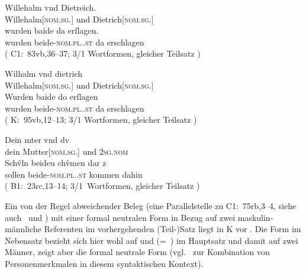 \begin{exe}
\ex \label{ex:dietwill2} %
	\begin{xlist}
	\ex \label{ex:dietwill2_2}
		\gll Willehalm vnd Dietreich. \\
			Willehalm[\textsc{nom.sg.\MascM}] und
				Dietrich[\textsc{nom.sg.\MascM}] \\
	\sn \gll wurden baíde da erſlagen. \\
			wurden beide-\textsc{nom.pl.\MascM.st} da erschlagen \\
		\trans {}
			(%
				C1:~83vb,36--37;
				3/1 Wortformen, gleicher Teilsatz%
			)

	\ex \label{ex:dietwill2_3}
		\gll Wilhalm vnd dietrich \\
			Willehalm[\textsc{nom.sg.\MascM}] und
				Dietrich[\textsc{nom.sg.\MascM}] \\
	\sn \gll Wurden baide do erſlagen \\
			wurden beide-\textsc{nom.pl.\MascM.st} da erschlagen \\
		\trans {}
			(%
				K:~95vb,12--13;
				3/1 Wortformen, gleicher Teilsatz%
			)
	\end{xlist}

\ex \label{ex:mutterdu2}
	\gll Dein mter vnd dv \\
		dein Mutter[\textsc{nom.sg.\FemF}] und \textsc{2sg\subM.nom} \\
\sn \gll Schv̂ln beideu chv̂men {dar z} \\
		sollen beide-\textsc{nom.pl.\NeutMF.st} kommen dahin \\
	\trans {}
		(%
			B1:~23rc,13--14;
			3/1~Wortformen, gleicher Teilsatz%
		)
\end{exe}

\label{phsec:baideuwarn3}
Ein von der Regel abweichender Beleg
(eine Parallelstelle zu C1:~75rb,3--4, siehe
auch~ und
) mit einer formal neutralen Form in Bezug auf zwei
maskulin-männ\-liche Referenten im vorhergehenden (Teil-)Satz liegt in K vor
. Die Form   im Nebensatz bezieht
sich hier wohl auf   und  
(=~) im Hauptsatz und damit auf zwei Männer, zeigt aber die formal
neutrale Form (vgl.~ zur Kombination von
Personenmerkmalen in diesem syntaktischen Kontext).

